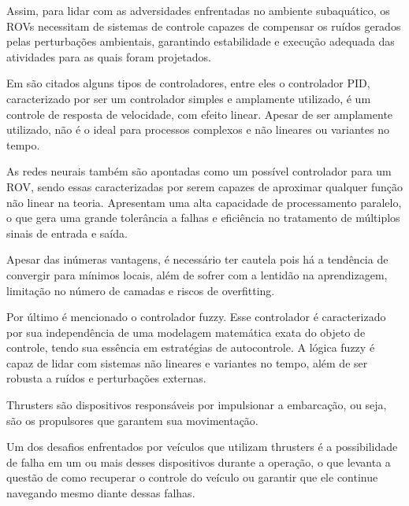 \documentclass[../main.tex]{subfiles}
\begin{document}
Assim, para lidar com as adversidades enfrentadas no ambiente subaquático, os ROVs necessitam de sistemas de controle capazes de compensar os ruídos gerados pelas perturbações ambientais, garantindo estabilidade e execução adequada das atividades para as quais foram projetados.

Em \cite{8559384} são citados alguns tipos de controladores, entre eles o controlador PID, caracterizado por ser um controlador simples e amplamente utilizado, é um controle de resposta de velocidade, com efeito linear. Apesar de ser amplamente utilizado, não é o ideal para processos complexos e não lineares ou variantes no tempo.

As redes neurais também são apontadas como um possível controlador para um ROV, sendo essas caracterizadas por serem capazes de aproximar qualquer função não linear na teoria. Apresentam uma alta capacidade de processamento paralelo, o que gera uma grande tolerância a falhas e eficiência no tratamento de múltiplos sinais de entrada e saída. 

Apesar das inúmeras vantagens, é necessário ter cautela pois há a tendência de convergir para mínimos locais, além de sofrer com a lentidão na aprendizagem, limitação no número de camadas e riscos de overfitting. 

Por último é mencionado o controlador fuzzy. Esse controlador é caracterizado por sua independência de uma modelagem matemática exata do objeto de controle, tendo sua essência em estratégias de autocontrole. A lógica fuzzy é capaz de lidar com sistemas não lineares e variantes no tempo, além de ser robusta a ruídos e perturbações externas.


Thrusters são dispositivos responsáveis por impulsionar a embarcação, ou seja, são os propulsores que garantem sua movimentação. 

Um dos desafios enfrentados por veículos que utilizam thrusters é a possibilidade de falha em um ou mais desses dispositivos durante a operação, o que levanta a questão de como recuperar o controle do veículo ou garantir que ele continue navegando mesmo diante dessas falhas.
\end{document}
